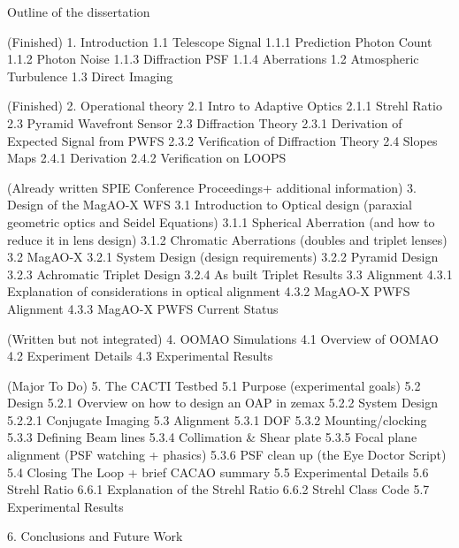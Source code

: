 Outline of the dissertation 


(Finished)    
1. Introduction 
    1.1 Telescope Signal
        1.1.1 Prediction Photon Count
        1.1.2 Photon Noise
        1.1.3 Diffraction PSF
        1.1.4 Aberrations
   1.2 Atmospheric Turbulence
   1.3 Direct Imaging

(Finished)        
2. Operational theory
    2.1 Intro to Adaptive Optics
        2.1.1 Strehl Ratio
    2.3 Pyramid Wavefront Sensor 
    2.3 Diffraction Theory
        2.3.1 Derivation of Expected Signal from PWFS
        2.3.2 Verification of Diffraction Theory
    2.4 Slopes Maps 
        2.4.1 Derivation
        2.4.2 Verification on LOOPS


(Already written SPIE Conference Proceedings+ additional information) 
3. Design of the MagAO-X WFS
    3.1 Introduction to Optical design (paraxial geometric optics and Seidel Equations)
        3.1.1 Spherical Aberration (and how to reduce it in lens design)
        3.1.2 Chromatic Aberrations (doubles and triplet lenses)
    3.2 MagAO-X
        3.2.1 System Design (design requirements)
        3.2.2 Pyramid Design
        3.2.3 Achromatic Triplet Design
        3.2.4 As built Triplet Results
    3.3 Alignment
        4.3.1 Explanation of considerations in optical alignment 
        4.3.2 MagAO-X PWFS Alignment
        4.3.3 MagAO-X PWFS Current Status

(Written but not integrated)
4. OOMAO Simulations
    4.1 Overview of OOMAO
    4.2 Experiment Details
    4.3 Experimental Results
 
(Major To Do)   
5. The CACTI Testbed
    5.1 Purpose (experimental goals)
    5.2 Design
        5.2.1 Overview on how to design an OAP in zemax
        5.2.2 System Design
            5.2.2.1 Conjugate Imaging
    5.3 Alignment
        5.3.1 DOF
        5.3.2 Mounting/clocking
        5.3.3 Defining Beam lines
        5.3.4 Collimation & Shear plate
        5.3.5 Focal plane alignment (PSF watching + phasics)
        5.3.6 PSF clean up (the Eye Doctor Script)
    5.4 Closing The Loop + brief CACAO summary
    5.5 Experimental Details
    5.6 Strehl Ratio
        6.6.1 Explanation of the Strehl Ratio
        6.6.2 Strehl Class Code
    5.7 Experimental Results
    
6. Conclusions and Future Work
    
        

